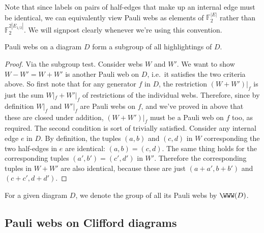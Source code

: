 Note that since labels on pairs of half-edges that make up an internal edge must be identical, we can equivalently view Pauli webs as elements of $\mathbb{F}_2^{|E|}$ rather than $\mathbb{F}_2^{2|E_{1/2}|}$.
We will signpost clearly whenever we're using this convention.

\begin{proposition}\label{prop:pauli_webs_general_form_subgroup}
    Pauli webs on a diagram $D$ form a subgroup of all highlightings of $D$.
    \begin{proof}
        Via the subgroup test.
        Consider webs $W$ and $W'$.
        We want to show $W - W' = W + W'$ is another Pauli web on $D$, i.e.\ it satisfies the two criteria above.
        So first note that for any generator $f$ in $D$, the restriction $(W + W')|_f$ is just the sum $W|_f + W'|_f$ of restrictions of the individual webs.
        Therefore, since by definition $W|_f$ and $W'|_f$ are Pauli webs on $f$, and we've proved in  above that these are closed under addition, $(W + W')|_f$ must be a Pauli web on $f$ too, as required.
        The second condition is sort of trivially satisfied.
        Consider any internal edge $e$ in $D$.
        By definition, the tuples $(a, b)$ and $(c, d)$ in $W$ corresponding the two half-edges in $e$ are identical: $(a, b) = (c, d)$.
        The same thing holds for the corresponding tuples $(a', b') = (c', d')$ in $W'$.
        Therefore the corresponding tuples in $W + W'$ are also identical, because these are just $(a + a', b + b')$ and $(c + c', d + d')$.
    \end{proof}
\end{proposition}

\begin{notation}
    For a given diagram $D$, we denote the group of all its Pauli webs by $\WWW(D)$.
\end{notation}

\subsection{Pauli webs on Clifford diagrams}\label{subsec:pauli_webs_clifford_diagrams}


